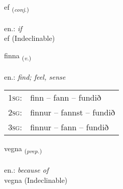 \documentclass[frontgrid, backgrid]{flacards}\usepackage[]{graphicx}\usepackage[]{xcolor}
\begin{document}
{ef \small{\textsubscript{(\textit{conj.})}} \\[1ex]
\textphonetic{[ɛːf]} \\
en.: \emph{if} \\  [2ex]
ef (Indeclinable)}

\renewcommand{\flhead}{\vskip5pt \fboxsep=0pt {\small\bfseries\footnotesize Sagnorð | Verb}}
\renewcommand{\fcfoot}{\vskip5pt \fboxsep=0pt \hspace{2pt}{\small\bfseries\footnotesize 1K}}

\renewcommand{\blhead}{\vskip5pt {\small\bfseries\footnotesize Sagnorð | Verb }}
\renewcommand{\bcfoot}{\vskip5pt \hspace{2pt}{\small\bfseries\footnotesize 1K}}


{finna \small{\textsubscript{(\textit{v.})}} \\[1ex] %
\textphonetic{[fɪna]} \\
en.: \emph{find; feel, sense} \\  [2ex]
\renewcommand*{\arraystretch}{0.8}
\begin{tabular}{p{1cm}l}
\textsc{1sg}: & finn -- fann -- fundið \\ 
\textsc{2sg}: & finnur -- fannst -- fundið \\ 
\textsc{3sg}: & finnur -- fann -- fundið \\ 
\end{tabular}
}


\renewcommand{\flhead}{\vskip5pt \fboxsep=0pt {\small\bfseries\footnotesize Forsetning | Preposition}}
\renewcommand{\fcfoot}{\vskip5pt \fboxsep=0pt \hspace{2pt}{\small\bfseries\footnotesize 1K}}

\renewcommand{\blhead}{\vskip5pt {\small\bfseries\footnotesize Forsetning | Preposition }}
\renewcommand{\bcfoot}{\vskip5pt \hspace{2pt}{\small\bfseries\footnotesize 1K}}


{vegna \small{\textsubscript{(\textit{prep.})}} \\[1ex]
\textphonetic{[vɛkna]} \\
en.: \emph{because of} \\  [2ex]
vegna (Indeclinable)}
\end{document}
